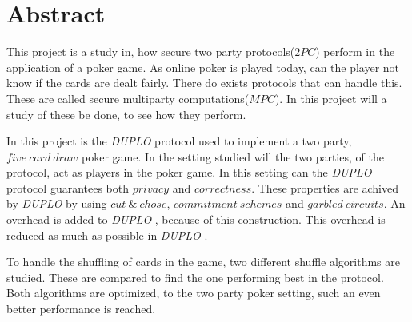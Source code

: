 \documentclass[twoside,11pt,openright]{report}
\newcommand{\DUPLO}{\textit{DUPLO} }
\begin{document}

\pagestyle{empty} 
\vspace*{\fill}
\clearpage


\pagestyle{plain}

\chapter*{Abstract}

This project is a study in, how secure two party protocols($2PC$) perform in the application of a poker game. As online poker is played today, can the player not know if the cards are dealt fairly. There do exists protocols that can handle this. These are called secure multiparty computations($MPC$). In this project will a study of these be done, to see how they perform.

In this project is the \DUPLO protocol used to implement a two party, $five~card~draw$ poker game. In the setting studied will the two parties, of the protocol, act as players in the poker game. In this setting can the \DUPLO protocol guarantees both $privacy$ and $correctness$. These properties are achived by \DUPLO by using $cut~\&~chose$, $commitment~schemes$ and $garbled~circuits$. An overhead is added to \DUPLO, because of this construction. This overhead is reduced as much as possible in \DUPLO.

To handle the shuffling of cards in the game, two different shuffle algorithms are studied. These are compared to find the one performing best in the protocol. Both algorithms are optimized, to the two party poker setting, such an even better performance is reached.
\end{document}
